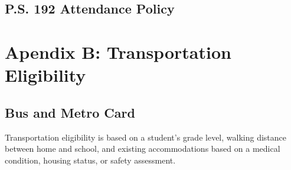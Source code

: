 \documentclass[letterpaper, 11pt]{article}
\begin{document}
\subsection{P.S. 192 Attendance Policy}
\label{sec:org092b10a}
\section{Apendix B: Transportation Eligibility}
\label{apendixB}
\subsection{Bus and Metro Card}
\label{sec:org5b71749}
Transportation eligibility is based on a student’s grade level, walking distance between home and school, and existing accommodations based on a medical condition, housing status, or safety assessment.
\end{document}
